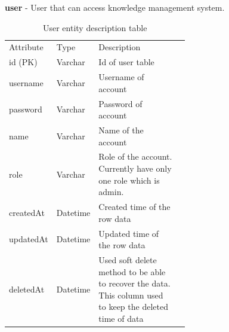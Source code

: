 \documentclass[12pt,oneside,openright,a4paper]{cpe-english-project}
\begin{document}
\pagebreak

\textbf{user} - User that can access knowledge management system.

\begin{table}[ht]
	\caption{User entity description table}
	\label{tab:User entity description table}
\begin{adjustbox}{width=\textwidth}
\begin{tabular}{llp{0.6\linewidth}l}
\rowcolor[HTML]{5B9BD5} 
Attribute & Type     & Description                                                                                                   \\
\rowcolor[HTML]{DEEAF6} 
id (PK)   & Varchar  & Id of user table                                                                                              \\
username  & Varchar  & Username of account                                                                                           \\
\rowcolor[HTML]{DEEAF6} 
password  & Varchar  & Password of account                                                                                           \\
name      & Varchar  & Name of the account                                                                                           \\
\rowcolor[HTML]{DEEAF6} 
role      & Varchar  & Role of the account. Currently have only one role which is admin.                                             \\
createdAt & Datetime & Created time of the row   data                                                                                \\
\rowcolor[HTML]{DEEAF6} 
updatedAt & Datetime & Updated time of the row data                                                                                  \\
deletedAt & Datetime & Used soft delete method   to be able to recover the data. This column used to keep the deleted time of   data
\end{tabular}
\end{adjustbox}
\end{table}
\end{document}
